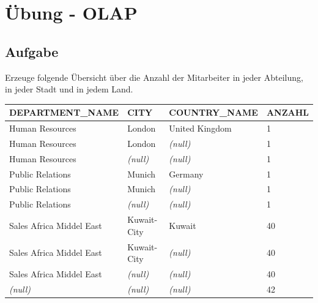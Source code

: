 \section{Übung - OLAP}
\label{sec:uebung_06}

\subsection{Aufgabe}
\label{sec:uebung_06.aufgabe_01}
Erzeuge folgende Übersicht über die Anzahl der Mitarbeiter in jeder Abteilung, in jeder Stadt und in jedem Land.

\begin{table}[H]
  \centering
  \ttfamily
  \begin{tabular}{|l|l|l|l|}
    \hline
    \textbf{DEPARTMENT\_NAME}  & \textbf{CITY}   & \textbf{COUNTRY\_NAME}   & \textbf{ANZAHL}   \\
    \hline
    Human Resources           & London          & United Kingdom          & 1                 \\
    Human Resources           & London          & \textit{(null)}         & 1                 \\
    Human Resources           & \textit{(null)} & \textit{(null)}         & 1                 \\
    Public Relations          & Munich          & Germany                 & 1                 \\
    Public Relations          & Munich          & \textit{(null)}         & 1                 \\
    Public Relations          & \textit{(null)} & \textit{(null)}         & 1                 \\
    Sales Africa Middel East  & Kuwait-City     & Kuwait                  & 40                \\
    Sales Africa Middel East  & Kuwait-City     & \textit{(null)}         & 40                \\
    Sales Africa Middel East  & \textit{(null)} & \textit{(null)}         & 40                \\
    \textit{(null)}           & \textit{(null)} & \textit{(null)}         & 42                \\
    \hline
  \end{tabular}
\end{table}

